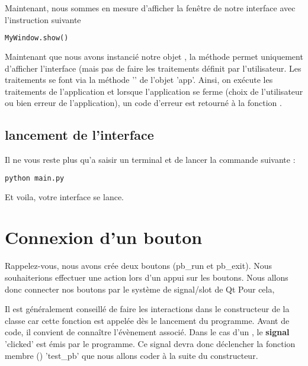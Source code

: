 \documentclass[12pt]{report}    %
\begin{document}
Maintenant, nous sommes en mesure  d'afficher la fenêtre de notre interface avec l'instruction suivante

\begin{lstlisting}[language=Python]
	MyWindow.show()
\end{lstlisting}

Maintenant que nous avons instancié notre objet , la méthode  permet uniquement d'afficher l'interface (mais pas de faire les traitements définit par l'utilisateur. \newline
Les traitements se font via la méthode '' de l'objet 'app'.
Ainsi, on exécute les traitements de l'application et lorsque l'application se ferme (choix de l'utilisateur ou bien erreur de l'application), un code d'erreur est retourné à la fonction .

\subsection{lancement de l'interface}

Il ne vous reste plus qu'a saisir un terminal et de lancer la commande suivante : 
\begin{lstlisting}[language=bash]
	python main.py
\end{lstlisting}


Et voila, votre interface se lance.



\section{Connexion d'un bouton}\label{exemple_signal}

Rappelez-vous, nous avons crée deux boutons (pb\_run et pb\_exit). Nous souhaiterions effectuer une action lors d'un appui sur les boutons. \newline
Nous allons donc connecter nos boutons par le système de signal/slot de Qt
Pour cela, \newline

Il est généralement conseillé de faire les interactions dans le constructeur de la classe car cette fonction est appelée dès le lancement du programme. \newline
Avant de code, il convient de connaître l'évènement associé. Dans le cas d'un , le \textbf{signal} 'clicked' est émis par le programme. \newline
Ce signal devra donc déclencher la fonction membre () 'test\_pb' que nous allons coder à la suite du constructeur. \newline
\end{document}
